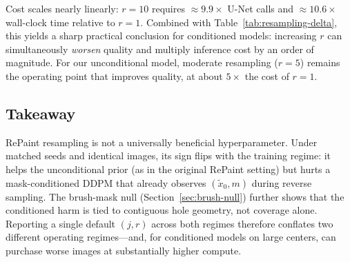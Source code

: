 Cost scales nearly linearly: $r{=}10$ requires ${\approx}9.9{\times}$ U-Net calls and ${\approx}10.6{\times}$ wall-clock time relative to $r{=}1$.
Combined with Table~\ref{tab:resampling-delta}, this yields a sharp practical conclusion for conditioned models: increasing $r$ can simultaneously \emph{worsen} quality and multiply inference cost by an order of magnitude.
For our unconditional model, moderate resampling ($r{=}5$) remains the operating point that improves quality, at about $5{\times}$ the cost of $r{=}1$.

\subsection{Takeaway}
\label{sec:takeaway}
RePaint resampling is not a universally beneficial hyperparameter.
Under matched seeds and identical images, its sign flips with the training regime: it helps the unconditional prior (as in the original RePaint setting) but hurts a mask-conditioned DDPM that already observes $(\tilde{x}_0,m)$ during reverse sampling.
The brush-mask null (Section~\ref{sec:brush-null}) further shows that the conditioned harm is tied to contiguous hole geometry, not coverage alone.
Reporting a single default $(j,r)$ across both regimes therefore conflates two different operating regimes---and, for conditioned models on large centers, can purchase worse images at substantially higher compute.
